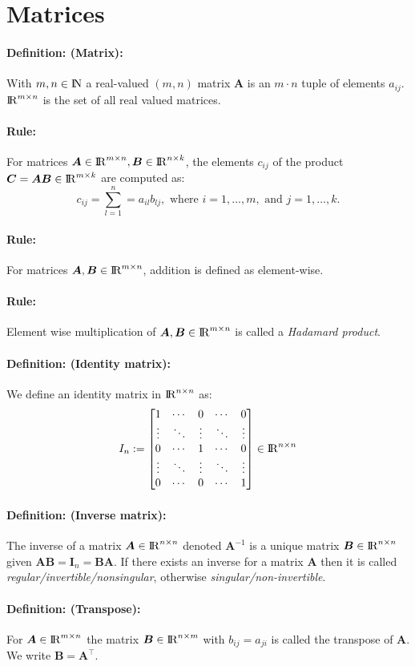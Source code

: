 \documentclass[12pt]{article}
\newcommand{\R}{{\rm I\!R}}
\newcommand{\N}{{\rm I\!N}}
\newcommand{\A}{{\bm{A}}}
\newcommand{\xdefinition}[2]{\paragraph{\colorbox{#1!30}{\textbf{Definition:}} (#2):}}
\newcommand{\xrule}[1]{\paragraph{\colorbox{#1!30}{\textbf{Rule:}}}}
\begin{document}
\section{Matrices}

\xdefinition{green}{Matrix} With $m, n \in \N$ a real-valued $(m, n)$ matrix $\A$ is an $m \cdot n$ tuple of elements $a_{ij}$. $\R^{m \times n}$ is the set of all real valued matrices.

\xrule{green} For matrices $\bm{A} \in \R^{m \times n}, \bm{B} \in \R^{n \times k}$, the elements $c_{ij}$ of the product $\bm{C} = \bm{AB} \in \R^{m \times k}$ are computed as:
%
\begin{equation}
	c_{ij} = \sum\limits_{l=1}^{n} = a_{il} b_{lj}, \text{ where } i = 1, \dots, m, \text{ and } j = 1, \dots, k.
\end{equation}

\xrule{green} For matrices $\A, \bm{B} \in \R^{m \times n}$, addition is defined as element-wise.

\xrule{green} Element wise multiplication of $\bm{A}, \bm{B} \in \R^{m \times n}$ is called a \textit{Hadamard product}.

\xdefinition{green}{Identity matrix} We define an identity matrix in $\R^{n \times n}$ as:
%
\begin{equation}
I_n := \begin{bmatrix}
    1 & \cdots & 0 & \cdots & 0 \\
    \vdots & \ddots & \vdots & \ddots & \vdots \\
    0 & \cdots & 1 & \cdots & 0 \\
    \vdots & \ddots & \vdots & \ddots & \vdots \\
    0 & \cdots & 0 & \cdots & 1
\end{bmatrix} \in \R^{n \times n}
\end{equation}

\xdefinition{green}{Inverse matrix} The inverse of a matrix $\bm{A} \in \R^{n \times n}$ denoted $\bm{A}^{-1}$ is a unique matrix $\bm{B} \in \R^{n \times n}$ given $\bm{AB} = \bm{I}_n = \bm{BA}$. If there exists an inverse for a matrix $\A$ then it is called \textit{regular/invertible/nonsingular}, otherwise \textit{singular/non-invertible}.

\xdefinition{green}{Transpose} For $\bm{A} \in \R^{m \times n}$ the matrix $\bm{B} \in \R^{n \times m}$ with $b_{ij} = a_{ji}$ is called the transpose of $\bm{A}$. We write $\bm{B} = \bm{A}^\top$.

\end{document}
